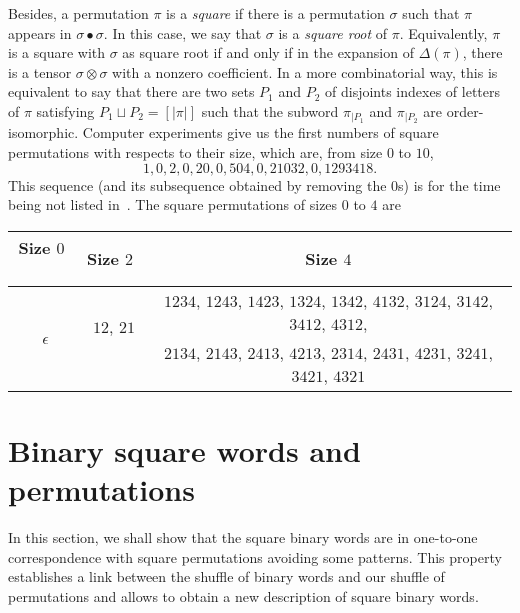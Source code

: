 \documentclass[a4paper]{llncs}
\DeclareMathOperator{\SHUFFLE}{\bullet}
\begin{document}
Besides, a permutation $\pi$ is a {\em square} if there is a
permutation $\sigma$ such that $\pi$ appears in $\sigma \SHUFFLE \sigma$.
In this case, we say that $\sigma$ is a {\em square root} of $\pi$.
Equivalently, $\pi$ is a square with $\sigma$ as square root if and only
if in the expansion of $\Delta(\pi)$, there is a tensor
$\sigma \otimes \sigma$ with a nonzero coefficient. In a more
combinatorial way, this is equivalent to say that there are two sets
$P_1$ and $P_2$ of disjoints indexes of letters of $\pi$ satisfying
$P_1 \sqcup P_2 = [|\pi|]$ such that the subword $\pi_{|P_1}$ and
$\pi_{|P_2}$ are order-isomorphic. Computer experiments give us the
first numbers of square permutations with respects to their size, which
are, from size $0$ to $10$,
\begin{equation}
    1, 0, 2, 0, 20, 0, 504, 0, 21032, 0, 1293418.
\end{equation}
This sequence (and its subsequence obtained by removing the $0$s) is for
the time being not listed in~\cite{Slo}. The square permutations of
sizes $0$ to $4$ are
\smallskip

\begin{tabular}{c|c|c}
    Size $0$ \, & Size $2$ & Size $4$ \\ \hline
    \multirow{2}{*}{\, $\epsilon$} &
    \multirow{2}{*}{\, $12$, $21$ \,} &
    $1234$, $1243$, $1423$, $1324$, $1342$, $4132$, $3124$, $3142$,
    $3412$, $4312$, \\
    & & $2134$, $2143$, $2413$, $4213$, $2314$, $2431$, $4231$, $3241$,
    $3421$, $4321$
\end{tabular}


\section{Binary square words and permutations}
\label{section:Binary square words and permutations}
In this section, we shall show that the square binary words are in
one-to-one correspondence with square permutations avoiding some
patterns. This property establishes a link between the shuffle of binary
words and our shuffle of permutations and allows to obtain a new
description of square binary words.
\end{document}
